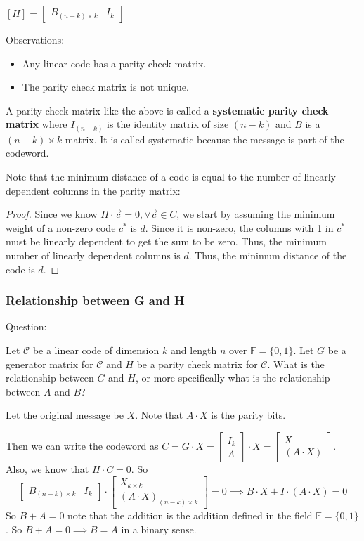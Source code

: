 \documentclass[letterpaper,12pt]{article}
\begin{document}
$[H]= \begin{bmatrix}
        B_{(n-k)\times k} & I_{k}
    \end{bmatrix}$

Observations:\begin{itemize}
    \item Any linear code has a parity check matrix.
    \item The parity check matrix is not unique.
\end{itemize}
A parity check matrix like the above is called a \textbf{systematic parity check matrix} where $I_{(n-k)}$ is the identity matrix of size $(n-k)$ and $B$ is a $(n-k)\times k$ matrix. It is called systematic because the message is part of the codeword.

Note that the minimum distance of a code is equal to the number of linearly dependent columns in the parity matrix: \begin{proof}
    Since we know $H\cdot \vec{c}=0,\forall \vec{c}\in C$, we start by assuming the minimum weight of a non-zero code $c^*$ is $d$. Since it is non-zero, the columns with 1 in $c^*$ must be linearly dependent to get the sum to be zero. Thus, the minimum number of linearly dependent columns is $d$. Thus, the minimum distance of the code is $d$.
\end{proof}
\subsubsection{Relationship between G and H}
Question:

Let $\mathcal{C}$ be a linear code of dimension $k$ and length $n$ over
$\mathbb{F}=\{0,1\}$. Let $G$ be a generator matrix for $\mathcal{C}$ and $H$
be a parity check matrix for $\mathcal{C}$. What is the relationship between
$G$ and $H$, or more specifically what is the relationship between $A$ and $B$?

Let the original message be $X$. Note that $A \cdot X$ is the parity bits.

Then we can write the codeword as $C = G \cdot X = \begin{bmatrix}
        I_k \\
        A
    \end{bmatrix} \cdot X = \begin{bmatrix}
        X \\
        (A \cdot X)
    \end{bmatrix}$. Also, we know that $H \cdot C = 0$. So \[
    \begin{bmatrix}
        B_{(n-k)\times k} & I_{k}
    \end{bmatrix} \cdot \begin{bmatrix}
        X_{k\times k} \\
        (A \cdot X)_{(n-k)\times k}
    \end{bmatrix} = 0 \implies B \cdot X + I \cdot (A \cdot X) = 0
\]
So $B+A=0$ note that the addition is the addition defined in the field
$\mathbb{F} = \{0,1\}$. So $B + A = 0 \implies B = A$ in a binary sense.
\end{document}
